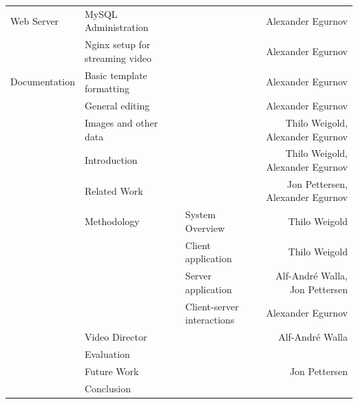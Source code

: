 \documentclass[conference]{IEEEtran}
\begin{document}
\begin{table}[t]
\begin{tabular}{lllr}
		\midrule
		Web Server
			& MySQL Administration & & Alexander Egurnov \\
			& Nginx setup for streaming video & & Alexander Egurnov \\
		\midrule
		Documentation 
			& Basic template formatting & & Alexander Egurnov \\
			& General editing & & Alexander Egurnov \\
			& Images and other data & & Thilo Weigold, Alexander Egurnov \\
			& Introduction & & Thilo Weigold, Alexander Egurnov \\
			& Related Work & & Jon Pettersen, Alexander Egurnov \\
			& Methodology & System Overview & Thilo Weigold \\
			&		& Client application & Thilo Weigold \\
			&		& Server application & Alf-André Walla, Jon Pettersen \\
			&		& Client-server interactions & Alexander Egurnov \\
			& Video Director & & Alf-André Walla \\
			& Evaluation & & \\
			& Future Work & & Jon Pettersen \\
			& Conclusion & & \\
		\bottomrule
    \end{tabular}%
\end{table}%

\vfill
\end{document}
